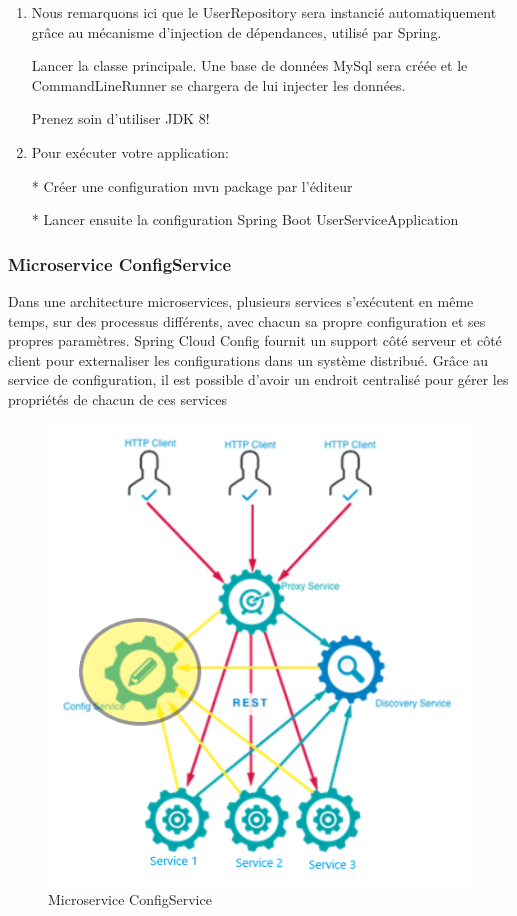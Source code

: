 \begin{enumerate}
\item Nous remarquons ici que le UserRepository sera instancié automatiquement grâce au mécanisme d'injection de dépendances, utilisé par Spring.

Lancer la classe principale. Une base de données MySql sera créée et le CommandLineRunner se chargera de lui injecter les données.


\begin{att}
	Prenez soin d'utiliser JDK 8!
\end{att}


\item Pour exécuter votre application:

  * Créer une configuration mvn package par l'éditeur  
    
        
    
  * Lancer ensuite la configuration Spring Boot UserServiceApplication  
  
    
\end{enumerate}
    
    
     
    
    
        
    \subsubsection{Microservice ConfigService}    
    Dans une architecture microservices, plusieurs services s'exécutent en même temps, sur des processus différents, avec chacun sa propre configuration et ses propres paramètres. Spring Cloud Config fournit un support côté serveur et côté client pour externaliser les configurations dans un système distribué. Grâce au service de configuration, il est possible d'avoir un endroit centralisé pour gérer les propriétés de chacun de ces services
    
    \begin{figure}[H]
    	\centering
    	\includegraphics[width=0.5\linewidth]{images/tp03}
    	\caption{Microservice ConfigService}
    	\label{fig:tp03}
    \end{figure}
    
